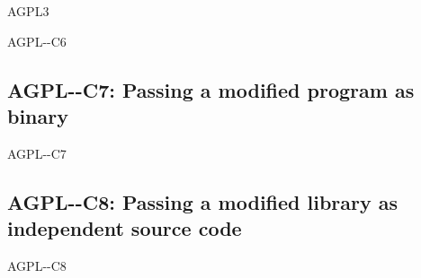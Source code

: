 \begin{license}{AGPL3}
\begin{lsuc}{AGPL-\ver-C6}
  \begin{lsucprohibits}
    \lsucitem{\noPatentLitigation}
  \end{lsucprohibits}
\end{lsuc}

\subsection{AGPL-\ver-C7: Passing a modified program as binary}
\begin{lsuc}{AGPL-\ver-C7}

  \useCaseSeven

  \begin{lsucrequires}
    \lsucmandatory{\keepLicenseElements}
    \lsucmandatory{\gplthreeEnsureCopyrightNoticeBinary}
    \lsucmandatory{\giveLicense}\passingFilesCorrectly
    \lsucmandatory{\retainCopyrightNotices}
    \lsucmandatory{\markProgramModifications}
    \lsucmandatory{\addToCopyrightDialogApp}
    \lsucmandatory{\arrangeProgramChanges}\howToApplyTheseTerms
    \lsucmandatory{\makeModifiedSourceAvailable}
    \lsucmandatory{\describeHowToGetSource}
    \lsucoptional{\createChangelog}
    \lsucoptional{\addToDocumentation}
  \end{lsucrequires}

  \begin{lsucprohibits}
    \lsucitem{\noPatentLitigation}
  \end{lsucprohibits}
\end{lsuc}

\subsection{AGPL-\ver-C8: Passing a modified library as independent source code}
\begin{lsuc}{AGPL-\ver-C8}

  \useCaseEight

  \begin{lsucrequires}
     \lsucmandatory{\keepLicenseElements}
    \lsucmandatory{\gplthreeEnsureCopyrightNoticeSource}
    \lsucmandatory{\giveLicense}\passingFilesCorrectly
    \lsucmandatory{\retainCopyrightNotices}
    \lsucmandatory{\markLibraryModifications}
    \lsucmandatory{\arrangeLibraryChanges}\howToApplyTheseTerms
    \lsucoptional{\createChangelog}
    \lsucoptional{\addToDocumentation}
  \end{lsucrequires}


\end{lsuc}
\end{license}
